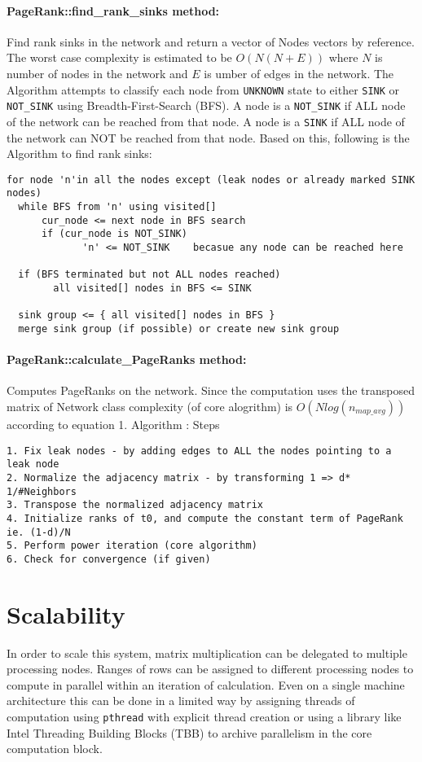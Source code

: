 \documentclass[10pt]{article}
\begin{document}
\paragraph{PageRank::find\_rank\_sinks method:}
Find rank sinks in the network and return a vector of Nodes vectors by 
reference. The worst case complexity is estimated to be $O(N (N+E) )$
where $N$ is number of nodes in the network and $E$ is umber of edges 
in the network. The Algorithm attempts to classify each node from \texttt{UNKNOWN} 
state to either \texttt{SINK} or \texttt{NOT\_SINK} using Breadth-First-Search (BFS).
A node is a \texttt{NOT\_SINK} if ALL node of the network can be reached from that node.
A node is a \texttt{SINK} if ALL node of the network can NOT be reached from that node.
Based on this, following is the Algorithm to find rank sinks:
\begin{verbatim}
for node 'n'in all the nodes except (leak nodes or already marked SINK nodes)
  while BFS from 'n' using visited[]
      cur_node <= next node in BFS search
      if (cur_node is NOT_SINK) 
             'n' <= NOT_SINK    becasue any node can be reached here

  if (BFS terminated but not ALL nodes reached) 
        all visited[] nodes in BFS <= SINK

  sink group <= { all visited[] nodes in BFS }
  merge sink group (if possible) or create new sink group
\end{verbatim}          

\paragraph{PageRank::calculate\_PageRanks method:}
Computes PageRanks on the network.
Since the computation uses the transposed matrix of Network class
complexity (of core alogrithm) is $O(N log(n_{map\_avg}))$ according to equation 1.
Algorithm : Steps
\begin{verbatim}
1. Fix leak nodes - by adding edges to ALL the nodes pointing to a leak node
2. Normalize the adjacency matrix - by transforming 1 => d* 1/#Neighbors
3. Transpose the normalized adjacency matrix
4. Initialize ranks of t0, and compute the constant term of PageRank ie. (1-d)/N
5. Perform power iteration (core algorithm)
6. Check for convergence (if given)
\end{verbatim}

\section{Scalability}
In order to scale this system, matrix multiplication can be delegated to multiple processing nodes. 
Ranges of rows can be assigned
to different processing nodes to compute in parallel within an iteration of calculation.
Even on a single machine architecture this can be done in a limited way by assigning threads of
computation using \texttt{pthread} with explicit thread creation or using a library like Intel 
Threading Building Blocks (TBB) to archive parallelism in the core computation block.
\end{document}
